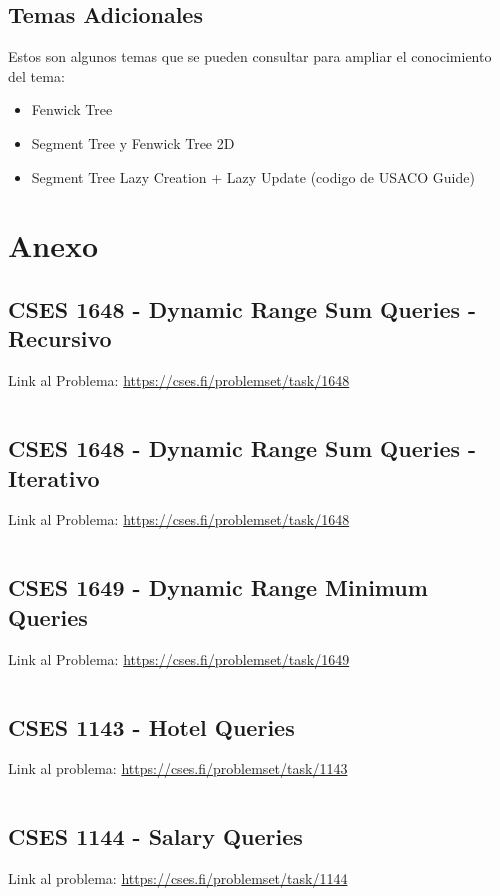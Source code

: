 \documentclass{article}
\begin{document}
\subsection{Temas Adicionales}
Estos son algunos temas que se pueden consultar para ampliar el conocimiento del tema:

\begin{itemize}
    \item Fenwick Tree
    \item Segment Tree y Fenwick Tree 2D
    \item Segment Tree Lazy Creation + Lazy Update (codigo de USACO Guide)
\end{itemize}

\newpage

\section{Anexo}

\subsection{CSES 1648 - Dynamic Range Sum Queries - Recursivo}
Link al Problema: \href{https://cses.fi/problemset/task/1648}{https://cses.fi/problemset/task/1648}
\inputminted{c++}{Problemas/1Recursivo.cpp}

\subsection{CSES 1648 - Dynamic Range Sum Queries - Iterativo}
Link al Problema: \href{https://cses.fi/problemset/task/1648}{https://cses.fi/problemset/task/1648}
\inputminted{c++}{Problemas/1Iterativo.cpp}

\subsection{CSES 1649 - Dynamic Range Minimum Queries}
Link al Problema: \href{https://cses.fi/problemset/task/1649}{https://cses.fi/problemset/task/1649}
\inputminted{c++}{Problemas/2.cpp}

\subsection{CSES 1143 - Hotel Queries}
Link al problema: \href{https://cses.fi/problemset/task/1143}{https://cses.fi/problemset/task/1143}
\inputminted{c++}{Problemas/4.cpp}

\subsection{CSES 1144 - Salary Queries}
Link al problema: \href{https://cses.fi/problemset/task/1144}{https://cses.fi/problemset/task/1144}
\inputminted{c++}{Problemas/5.cpp}
\end{document}
